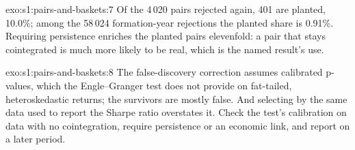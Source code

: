 \begin{solution}{exo:s1:pairs-and-baskets:7}
Of the 4\,020 pairs rejected again, 401 are planted, 10.0\%; among the 58\,024 formation-year rejections the planted share is 0.91\%. Requiring persistence
enriches the planted pairs elevenfold: a pair that stays cointegrated is much more likely to be real, which is the named result's use.
\end{solution}

\begin{solution}{exo:s1:pairs-and-baskets:8}
The false-discovery correction assumes calibrated p-values, which the Engle--Granger test does not provide on fat-tailed, heteroskedastic returns; the
survivors are mostly false. And selecting by the same data used to report the Sharpe ratio overstates it. Check the test's calibration on data with no
cointegration, require persistence or an economic link, and report on a later period.
\end{solution}

